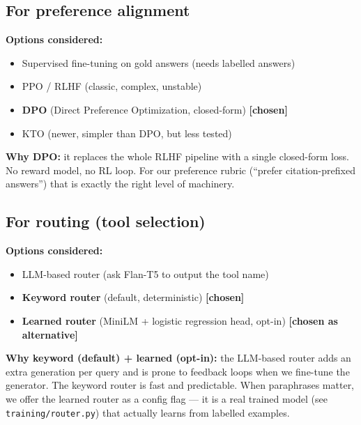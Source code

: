\documentclass[11pt,a4paper]{article}
\begin{document}
\subsection{For preference alignment}

\begin{alt}
\textbf{Options considered:}
\begin{itemize}[leftmargin=*, itemsep=0pt, topsep=0pt]
\item Supervised fine-tuning on gold answers (needs labelled answers)
\item PPO / RLHF (classic, complex, unstable)
\item \textbf{DPO} (Direct Preference Optimization, closed-form) \textbf{[chosen]}
\item KTO (newer, simpler than DPO, but less tested)
\end{itemize}
\end{alt}

\textbf{Why DPO:} it replaces the whole RLHF pipeline with a single closed-form loss. No reward model, no RL loop. For our preference rubric (``prefer citation-prefixed answers'') that is exactly the right level of machinery.

\subsection{For routing (tool selection)}

\begin{alt}
\textbf{Options considered:}
\begin{itemize}[leftmargin=*, itemsep=0pt, topsep=0pt]
\item LLM-based router (ask Flan-T5 to output the tool name)
\item \textbf{Keyword router} (default, deterministic) \textbf{[chosen]}
\item \textbf{Learned router} (MiniLM + logistic regression head, opt-in) \textbf{[chosen as alternative]}
\end{itemize}
\end{alt}

\textbf{Why keyword (default) + learned (opt-in):} the LLM-based router adds an extra generation per query and is prone to feedback loops when we fine-tune the generator. The keyword router is fast and predictable. When paraphrases matter, we offer the learned router as a config flag --- it is a real trained model (see \texttt{training/router.py}) that actually learns from labelled examples.
\end{document}
